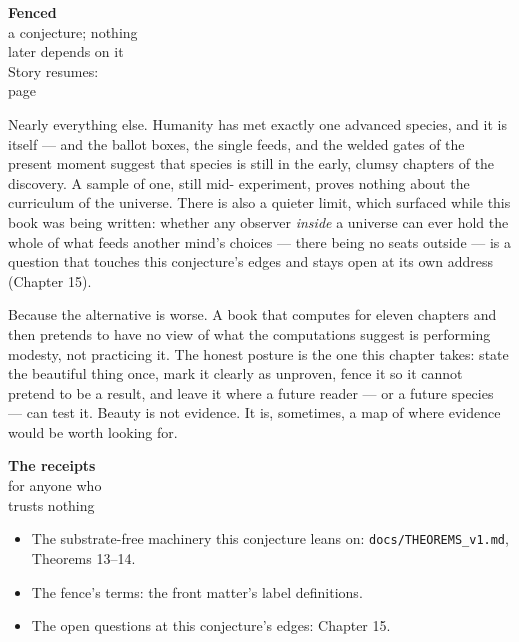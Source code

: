 \begin{fenced}{\textbf{Fenced}\\a conjecture; nothing\\later depends on it\\[3pt]{\color{muted}Story resumes:\\page~\pageref{partV}}}

Nearly everything else. Humanity has met exactly one advanced species,
and it is itself --- and the ballot boxes, the single feeds, and the
welded gates of the present moment suggest that species is still in
the early, clumsy chapters of the discovery. A sample of one, still mid-
experiment, proves nothing about the curriculum of the universe.
There is also a quieter limit, which surfaced while this book was being written:
whether any observer \emph{inside} a universe can ever hold the whole of
what feeds another mind's choices --- there being no seats outside ---
is a question that touches this conjecture's edges and stays open at
its own address (Chapter 15).


Because the alternative is worse. A book that computes for eleven
chapters and then pretends to have no view of what the computations
suggest is performing modesty, not practicing it. The honest posture
is the one this chapter takes: state the beautiful thing once, mark
it clearly as unproven, fence it so it cannot pretend to be a result,
and leave it where a future reader --- or a future species --- can test
it. Beauty is not evidence. It is, sometimes, a map of where evidence
would be worth looking for.

\end{fenced}

\begin{receipts}{\textbf{The receipts}\\for anyone who\\trusts nothing}


\begin{itemize}
\tightlist
\item
  The substrate-free machinery this conjecture leans on:
  \texttt{docs/\allowbreak{}THEOREMS\_\allowbreak{}v1.\allowbreak{}md}, Theorems 13--14.
\item
  The fence's terms: the front matter's label definitions.
\item
  The open questions at this conjecture's edges: Chapter 15.
\end{itemize}

\end{receipts}

\renewcommand{\partlist}{\partline{13}{The Ledger}{ch13}\partline{14}{What the Model Says to Do}{ch14}\partline{15}{What Each Open Question Requires}{ch15}}\renewcommand{\runninghead}{The Ledger}


